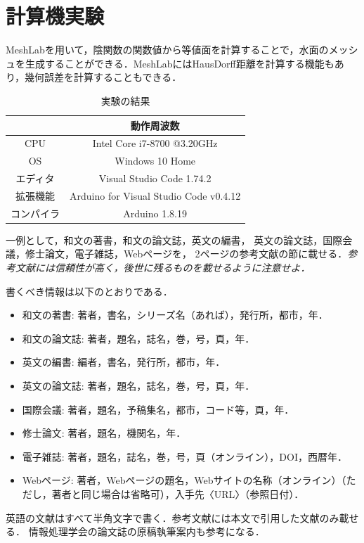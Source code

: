 \documentclass[a4j,12pt]{jreport}
\begin{document}
\chapter{計算機実験} \label{chapter:5}
MeshLabを用いて，陰関数の関数値から等値面を計算することで，水面のメッシュを生成することができる．MeshLabにはHausDorff距離を計算する機能もあり，幾何誤差を計算することもできる．
\begin{table}[H]
    \centering
    \caption{実験の結果} \label{table:実験の結果}
    \begin{tabular}{|c|c|} \hline
                 & 動作周波数                             \\ \hline\hline
      CPU        & Intel Core i7-8700 @3.20GHz            \\
      OS         & Windows 10 Home                        \\
      エディタ   & Visual Studio Code 1.74.2              \\
      拡張機能   & Arduino for Visual Studio Code v0.4.12 \\
      コンパイラ & Arduino 1.8.19                         \\ \hline
    \end{tabular}
  \end{table}
一例として，和文の著書\cite{suetake}，和文の論文誌\cite{kusano}，英文の編書\cite{fuortes}，
英文の論文誌\cite{rice}，国際会議\cite{guibas}，修士論文\cite{chudai}，電子雑誌\cite{iwama}，Webページ\cite{IPSJ}を，
2ページの参考文献の節に載せる．{\em 参考文献には信頼性が高く，後世に残るものを載せるように注意せよ．}

書くべき情報は以下のとおりである．
\begin{itemize}
\item 和文の著書: 著者，書名，シリーズ名（あれば），発行所，都市，年．
\item 和文の論文誌: 著者，題名，誌名，巻，号，頁，年．
\item 英文の編書: 編者，書名，発行所，都市，年．
\item 英文の論文誌: 著者，題名，誌名，巻，号，頁，年．
\item 国際会議: 著者，題名，予稿集名，都市，コード等，頁，年．
\item 修士論文: 著者，題名，機関名，年．
\item 電子雑誌: 著者，題名，誌名，巻，号，頁（オンライン），DOI，西暦年．
\item Webページ: 著者，Webページの題名，Webサイトの名称（オンライン）（ただし，著者と同じ場合は省略可），入手先〈URL〉（参照日付）．
\end{itemize}
英語の文献はすべて半角文字で書く．参考文献には本文で引用した文献のみ載せる．
情報処理学会の論文誌の原稿執筆案内\cite{IPSJ}も参考になる．
\end{document}

